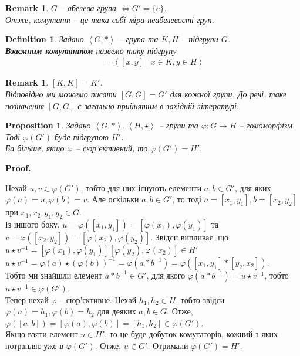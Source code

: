 \documentclass[a4paper, 10pt]{article}
\makeatletter
\theoremstyle{theoremdd}
\theoremstyle{theoremdd}
\newtheorem{definition}[theorem]{Definition}
\theoremstyle{theoremdd}
\theoremstyle{theoremdd}
\theoremstyle{theoremdd}
\theoremstyle{theoremdd}
\theoremstyle{theoremdd}
\theoremstyle{theoremdd}
\theoremstyle{theoremdd}
\newtheorem{proposition}[theorem]{Proposition}
\theoremstyle{theoremdd}
\theoremstyle{theoremdd}
\newtheorem{remark}[theorem]{Remark}
\theoremstyle{theoremdd}
\theoremstyle{theoremdd}
\theoremstyle{theoremdd}
\theoremstyle{theoremdd}
\renewenvironment{proof}[1][Proof.\\]{\par
\pushQED{\hfill \qed}%
\normalfont \topsep6\p@\@plus6\p@\relax
\trivlist
\item\relax
{\bfseries
#1\@addpunct{.}}\hspace\labelsep\ignorespaces
}{%
\popQED\endtrivlist\@endpefalse
}
\makeatother
\begin{document}
\begin{remark}
$G$ -- абелева група $\iff G' = \{e\}$.\\
Отже, комутант -- це така собі міра неабелевості груп.
\end{remark}

\begin{definition}
Задано $\left<G,*\right>$ -- група та $K,H$ -- підгрупи $G$.\\
\textbf{Взаємним комутантом} назвемо таку підгрупу
\begin{align*}
[K,H] = \left< [x,y] \mid x \in K, y \in H \right>
\end{align*}
\end{definition}

\begin{remark}
$[K,K] = K'$.\\
Відповідно ми можемо писати $[G,G] = G'$ для кожної групи. До речі, таке позначення $[G,G]$ є загально прийнятим в західній літературі.
\end{remark}

\begin{proposition}
Задано $\left< G, *\right>, \left<H,\star \right>$ -- групи та $\varphi \colon G \to H$ -- гомоморфізм. Тоді $\varphi(G')$ буде підгрупою $H'$.\\
Ба більше, якщо $\varphi$ -- сюр'єктивний, то $\varphi(G') = H'$.
\end{proposition}

\begin{proof}
Нехай $u,v \in \varphi(G')$, тобто для них існують елементи $a,b \in G'$, для яких $\varphi(a) = u, \varphi(b) = v$. Але оскільки $a,b \in G'$, то тоді $a = [x_1,y_1], b = [x_2,y_2]$ при $x_1,x_2,y_1,y_2 \in G$.\\
Із іншого боку, $u = \varphi([x_1,y_1]) = [\varphi(x_1),\varphi(y_1)]$ та $v = \varphi([x_2,y_2]) = [\varphi(x_2), \varphi(y_2)]$. Звідси випливає, що\\
$u \star v^{-1} = [\varphi(x_1),\varphi(y_1)] [\varphi(y_2),\varphi(x_2)] \in H'$\\
$u \star v^{-1} = \varphi(a) \star (\varphi(b))^{-1} = \varphi(a*b^{-1}) = \varphi([x_1,y_1]*[y_2,x_2])$.\\
Тобто ми знайшли елемент $a*b^{-1} \in G'$, для якого $\varphi(a*b^{-1}) = u \star v^{-1}$, тобто $u \star v^{-1} \in \varphi(G')$.
\bigskip \\
Тепер нехай $\varphi$ -- сюр'єктивне. Нехай $h_1,h_2 \in H$, тобто звідси $\varphi(a) = h_1, \varphi(b) = h_2$ для деяких $a,b \in G$. Отже,\\
$\varphi([a,b]) = [\varphi(a),\varphi(b)] = [h_1,h_2] \in \varphi(G')$.\\
Якщо взяти елемент $u \in H'$, то це буде добуток комутаторів, кожний з яких потрапляє уже в $\varphi(G')$. Отже, $u \in G'$. Отримали $\varphi(G') = H'$.
\end{proof}
\end{document}

